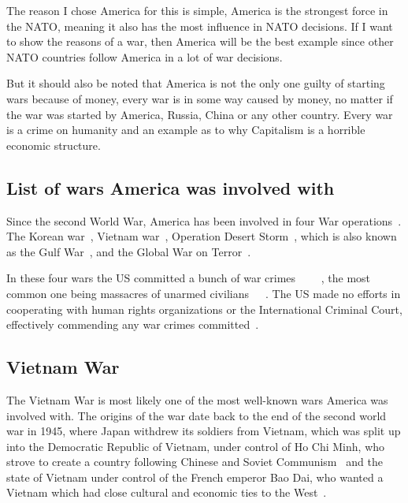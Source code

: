 \documentclass[12pt,a4paper]{article}
\begin{document}
		The reason I chose America for this is simple, America is the strongest force in the NATO\cite{statista-nato-aircraft-strength}, meaning it also has the most influence in NATO decisions. If I want to show the reasons of a war, then America will be the best example since other NATO countries follow America in a lot of war decisions.
		
		But it should also be noted that America is not the only one guilty of starting wars because of money, every war is in some way caused by money, no matter if the war was started by America, Russia, China or any other country. Every war is a crime on humanity and an example as to why Capitalism is a horrible economic structure.
		\subsection{List of wars America was involved with}
		Since the second World War, America has been involved in four War operations~\cite{va-gov-american-wars}.
		The Korean war~\cite{va-gov-american-wars}, Vietnam war~\cite{va-gov-american-wars}, Operation Desert Storm~\cite{va-gov-american-wars}, which is also known as the Gulf War~\cite{defense-gov-gulf}, and the Global War on Terror~\cite{va-gov-american-wars}.
		
		In these four wars the US committed a bunch of war crimes ~\cite{globalpolicy-iraq-warcrimes}~\cite{historynews-vietnam-warcrimes}~\cite{hrw-hr-abuses-afghanistan}~\cite{washingtonpost-korea-warcrimes}, the most common one being massacres of unarmed civilians~\cite{asiasociety-nogun-ri}~\cite{history-my-lai}~\cite{theguardian-shinwar-shooting}. The US made no efforts in cooperating with human rights organizations or the International Criminal Court, effectively commending any war crimes committed~\cite{globaltimes-us-evade-warcrimes}.
		\subsection{Vietnam War}
		The Vietnam War is most likely one of the most well-known wars America was involved with.
		The origins of the war date back to the end of the second world war in 1945, where Japan withdrew its soldiers from Vietnam, which was split up into the Democratic Republic of Vietnam, under control of Ho Chi Minh, who strove to create a country following Chinese and Soviet Communism~\cite{vietnam-war-history} and the state of Vietnam under control of the French emperor Bao Dai, who wanted a Vietnam which had close cultural and economic ties to the West~\cite{vietnam-war-history}.
		
\end{document}
